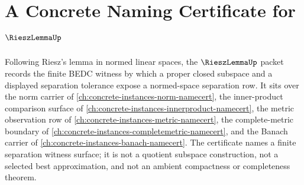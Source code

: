 \chapter{A Concrete Naming Certificate for $\RieszLemmaUp$}
\label{ch:concrete-instances-riesz-lemma-namecert}

Following Riesz's lemma in normed linear spaces, the $\RieszLemmaUp$ packet records the finite BEDC witness by which a proper closed subspace and a displayed separation tolerance expose a normed-space separation row. It sits over the norm carrier of \autoref{ch:concrete-instances-norm-namecert}, the inner-product comparison surface of \autoref{ch:concrete-instances-innerproduct-namecert}, the metric observation row of \autoref{ch:concrete-instances-metric-namecert}, the complete-metric boundary of \autoref{ch:concrete-instances-completemetric-namecert}, and the Banach carrier of \autoref{ch:concrete-instances-banach-namecert}. The certificate names a finite separation witness surface; it is not a quotient subspace construction, not a selected best approximation, and not an ambient compactness or completeness theorem.

